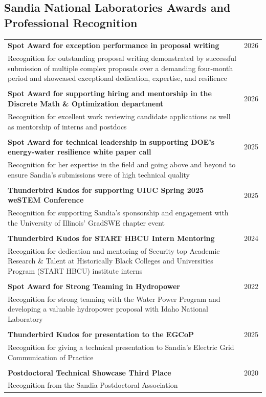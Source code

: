 \documentclass{article}[12pt]
\begin{document}
		\newpage
		\subsection*{Sandia National Laboratories Awards and Professional Recognition}
		
		\vspace{-1em}
		
		\begin{tabularx}{\textwidth}{Xr}
			
			\textbf{Spot Award for exception performance in proposal writing} & 2026\\
			Recognition for outstanding proposal writing demonstrated by successful submission of multiple complex proposals over a demanding four-month period and showcased exceptional dedication, expertise, and resilience
			\\
			\\
			\textbf{Spot Award for supporting hiring and mentorship in the Discrete Math \& Optimization department} & 2026 \\
			Recognition for excellent work reviewing candidate applications as well as mentorship of interns and postdocs
			\\
			\\
			\textbf{Spot Award for technical leadership in supporting DOE's energy-water resilience white paper call} & 2025 \\
			Recognition for her expertise in the field and going above and beyond  to ensure Sandia's submissions were of high technical quality
			\\
			\\
			\textbf{Thunderbird Kudos for supporting UIUC Spring 2025 weSTEM Conference} & 2025 \\
			Recognition for supporting Sandia's sponsorship and engagement with the University of Illinois' GradSWE chapter event
			\\
			\\	
			\textbf{Thunderbird Kudos for START HBCU Intern Mentoring} & 2024 \\
			Recognition for dedication and mentoring of Security top Academic Research \& Talent at Historically Black Colleges and Universities Program (START HBCU) institute interns
			\\
			\\	
			\textbf{Spot Award for Strong Teaming in Hydropower} & 2022 \\
			Recognition for strong teaming with the Water Power Program and developing a valuable hydropower proposal with Idaho National Laboratory 
			\\
			\\	
			\textbf{Thunderbird Kudos for presentation to the EGCoP} & 2025 \\
			Recognition for giving a technical presentation to Sandia's Electric Grid Communication of Practice
			\\
			\\
			\textbf{Postdoctoral Technical Showcase Third Place} & 2020 \\
			Recognition from the Sandia Postdoctoral Association
		\end{tabularx}
		
\end{document}
